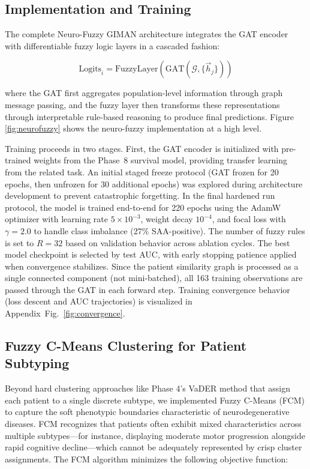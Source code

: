 \documentclass[journal,twoside,web]{ieeecolor}
\begin{document}
\subsection{Implementation and Training}
The complete Neuro-Fuzzy GIMAN architecture integrates the GAT encoder with differentiable fuzzy logic layers in a cascaded fashion:

\begin{equation}
\text{Logits}_i = \text{FuzzyLayer}(\text{GAT}(\mathcal{G}, \{\vec{h}_j\}))
\end{equation}

where the GAT first aggregates population-level information through graph message passing, and the fuzzy layer then transforms these representations through interpretable rule-based reasoning to produce final predictions. Figure \ref{fig:neurofuzzy} shows the neuro-fuzzy implementation at a high level.

Training proceeds in two stages. First, the GAT encoder is initialized with pre-trained weights from the Phase~8 survival model, providing transfer learning from the related task. An initial staged freeze protocol (GAT frozen for 20 epochs, then unfrozen for 30 additional epochs) was explored during architecture development to prevent catastrophic forgetting. In the final hardened run protocol, the model is trained end-to-end for 220 epochs using the AdamW optimizer with learning rate $5 \times 10^{-3}$, weight decay $10^{-4}$, and focal loss \cite{guo2017calibration} with $\gamma = 2.0$ to handle class imbalance (27\% SAA-positive). The number of fuzzy rules is set to $R = 32$ based on validation behavior across ablation cycles. The best model checkpoint is selected by test AUC, with early stopping patience applied when convergence stabilizes. Since the patient similarity graph is processed as a single connected component (not mini-batched), all 163 training observations are passed through the GAT in each forward step. Training convergence behavior (loss descent and AUC trajectories) is visualized in Appendix~Fig.~\ref{fig:convergence}.

\subsection{Fuzzy C-Means Clustering for Patient Subtyping}
Beyond hard clustering approaches like Phase 4's VaDER method that assign each patient to a single discrete subtype, we implemented Fuzzy C-Means (FCM) \cite{bezdek1981pattern} to capture the soft phenotypic boundaries characteristic of neurodegenerative diseases. FCM recognizes that patients often exhibit mixed characteristics across multiple subtypes---for instance, displaying moderate motor progression alongside rapid cognitive decline---which cannot be adequately represented by crisp cluster assignments. The FCM algorithm minimizes the following objective function:
\end{document}
